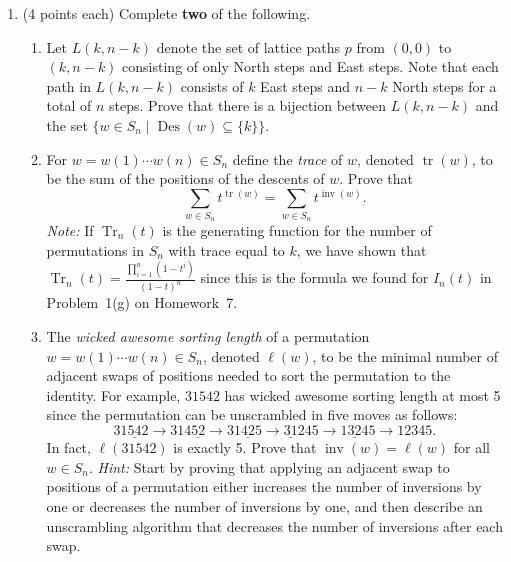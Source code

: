 \documentclass[11pt]{article}
\theoremstyle{definition}
\DeclareMathOperator{\inv}{inv}
\DeclareMathOperator{\Des}{Des}
\DeclareMathOperator{\tr}{tr}
\DeclareMathOperator{\Tr}{Tr}
\begin{document}
\begin{enumerate}
\begin{enumerate}
\end{enumerate}

\item (4 points each) Complete \textbf{two} of the following.
\begin{enumerate}

\item Let $L(k,n-k)$ denote the set of lattice paths $p$ from $(0,0)$ to $(k,n-k)$ consisting of only North steps and East steps. Note that each path in $L(k,n-k)$ consists of $k$ East steps and $n-k$ North steps for a total of $n$ steps. Prove that there is a bijection between $L(k,n-k)$ and the set $\{w\in S_n\mid \Des(w)\subseteq \{k\}\}$.

\item For $w=w(1)\cdots w(n)\in S_n$ define the \emph{trace} of $w$, denoted $\tr(w)$, to be the sum of the positions of the descents of $w$. Prove that
\[
\sum_{w\in S_n}t^{\tr(w)}=\sum_{w\in S_n}t^{\inv(w)}.
\]
\emph{Note:} If $\Tr_n(t)$ is the generating function for the number of permutations in $S_n$ with trace equal to $k$, we have shown that $\displaystyle \Tr_n(t)=\frac{\prod_{i=1}^n(1-t^i)}{(1-t)^n}$ since this is the formula we found for $I_n(t)$ in Problem~1(g) on Homework~7.

\item The \emph{wicked awesome sorting length} of a permutation $w=w(1)\cdots w(n)\in S_n$, denoted $\ell(w)$, to be the minimal number of adjacent swaps of positions needed to sort the permutation to the identity. For example, $31542$ has wicked awesome sorting length at most 5 since the permutation can be unscrambled in five moves as follows:
\[
31\underline{54}2 \to 314\underline{52} \to 31\underline{42}5 \to \underline{31}245 \to 1\underline{32}45 \to 12345.
\]
In fact, $\ell(31542)$ is exactly 5. Prove that $\inv(w)=\ell(w)$ for all $w\in S_n$. \emph{Hint:} Start by proving that applying an adjacent swap to positions of a permutation either increases the number of inversions by one or decreases the number of inversions by one, and then describe an unscrambling algorithm that decreases the number of inversions after each swap.


\end{enumerate}
\end{enumerate}
\end{document}
